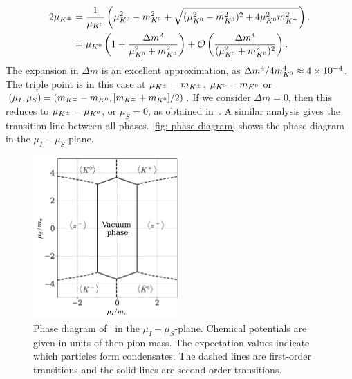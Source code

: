 \begin{align}
    \nonumber
    2 \mu_{K^\pm} 
    &= \frac{1}{\mu_{K^0}}
    \left(
        \mu_{K^0}^2 - m_{K^0}^2  + \sqrt{(\mu_{K^0}^2 - m_{K^0}^2)^2 + 4\mu_{K^0}^2m_{K^\pm}^2}
    \right).
    \\
    &= \mu_{K^0} \left(1 + \frac{\Delta m^2}{\mu_{K^0}^2 + m_{K^0}^2}\right)
    + \mathcal O\left( \frac{\Delta m^4}{ (\mu_{K^0}^2 + m_{K^0}^2)^2} \right).
\end{align}
%
The expansion in $\Delta m$ is an excellent approximation, as $\Delta m^4 / 4 m_{K^0}^4 \approx 4 \times 10^{-4}$.
The triple point is in this case at $\mu_{K^\pm} = m_{K^\pm}$, $\mu_{K^0} = m_{K^0}$ or $(\mu_I, \mu_S) = (m_{K^\pm} - m_{K^0}, [m_{K^\pm}+m_{K^0}]/2)$.
If we consider $\Delta m = 0$, then this reduces to $ \mu_{K^\pm} = \mu_{K^0}$, or $\mu_S = 0$, as obtained in~\autocite{kogutQCDSmallNonzero2001}.
A similar analysis gives the transition line between all phases.
\autoref{fig: phase diagram} shows the phase diagram in the $\mu_I-\mu_S$-plane.

\begin{figure}[h]
    \centering
    \includegraphics[width=0.5\textwidth]{../scripts/figurer/phase_diagram.pdf}
    \hspace{2mm}
    \caption{
        Phase diagram of \chpt\ in the $\mu_I-\mu_S$-plane.
        Chemical potentials are given in units of then pion mass.
        The expectation values indicate which particles form condensates.
        The dashed lines are first-order transitions and the solid lines are second-order transitions.
        }
    \label{fig: phase diagram}
\end{figure}

